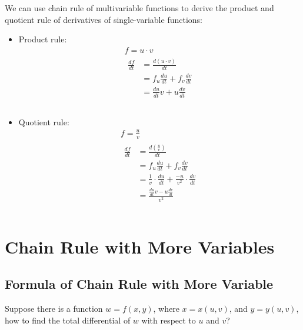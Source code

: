 \documentclass{article}
\begin{document}
We can use chain rule of multivariable functions to derive the product and 
quotient rule of derivatives of single-variable functions:
\begin{itemize}
  \item Product rule:
    \begin{gather*}
      f = u \cdot v \\
      \begin{split}
        \frac{df}{dt} &= \frac{d(u \cdot v)}{dt} \\
                      &= f_u \frac{du}{dt} + f_v \frac{dv}{dt} \\
                      &= \frac{du}{dt} v + u \frac{dv}{dt} \\
      \end{split} \\
    \end{gather*}
  \item Quotient rule:
    \begin{gather*}
      f = \frac{u}{v} \\
      \begin{split}
        \frac{df}{dt} &= \frac{d(\frac{u}{v})}{dt} \\
                      &= f_u \frac{du}{dt} + f_v \frac{dv}{dt} \\
                      &= \frac{1}{v} \cdot \frac{du}{dt} + \frac{-u}{v^2} \cdot \frac{dv}{dt} \\
                      &= \frac{\frac{du}{dt}v - u\frac{dv}{dt}}{v^2} \\
      \end{split} \\
    \end{gather*}
\end{itemize}

\section{Chain Rule with More Variables}

\subsection{Formula of Chain Rule with More Variable}

Suppose there is a function $w = f(x, y)$, where $x = x(u, v)$, and 
$y = y(u, v)$, how to find the total differential of $w$ with respect to $u$ and 
$v$?
\end{document}
